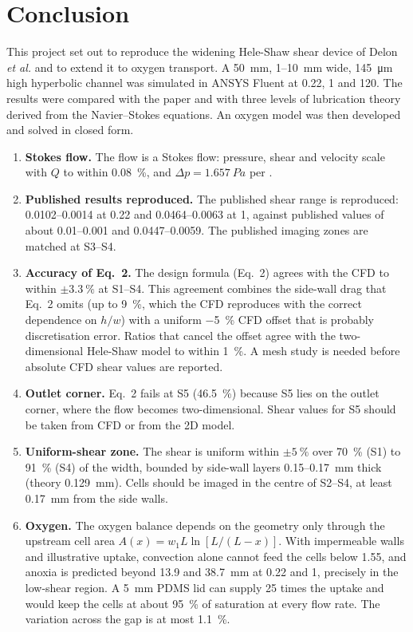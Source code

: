 \chapter{Conclusion}
\label{ch:conclusion}

This project set out to reproduce the widening Hele-Shaw shear device of Delon \emph{et al.} \citep{Delon2020} and to extend it to oxygen transport. A \SI{50}{mm}, \SI{1}{}--\SI{10}{mm} wide, \SI{145}{\micro\metre} high hyperbolic channel was simulated in ANSYS Fluent at 0.22, 1 and \SI{120}{\uLmin}. The results were compared with the paper and with three levels of lubrication theory derived from the Navier--Stokes equations. An oxygen model was then developed and solved in closed form.

\begin{enumerate}
\item \textbf{Stokes flow.} The flow is a Stokes flow: pressure, shear and velocity scale with $Q$ to within \SI{0.08}{\percent}, and $\Delta p=\SI{1.657}{Pa}$ per \ulmin.
\item \textbf{Published results reproduced.} The published shear range is reproduced: \SIrange{0.0102}{0.0014}{\dyncm} at \SI{0.22}{\uLmin} and \SIrange{0.0464}{0.0063}{\dyncm} at \SI{1}{\uLmin}, against published values of about 0.01--0.001 and 0.0447--0.0059. The published imaging zones are matched at S3--S4.
\item \textbf{Accuracy of Eq.~2.} The design formula (Eq.~2) agrees with the CFD to within $\pm\SI{3.3}{\percent}$ at S1--S4. This agreement combines the side-wall drag that Eq.~2 omits (up to \SI{+9}{\percent}, which the CFD reproduces with the correct dependence on $h/w$) with a uniform \SI{-5}{\percent} CFD offset that is probably discretisation error. Ratios that cancel the offset agree with the two-dimensional Hele-Shaw model to within \SI{1}{\percent}. A mesh study is needed before absolute CFD shear values are reported.
\item \textbf{Outlet corner.} Eq.~2 fails at S5 (\SI{+46.5}{\percent}) because S5 lies on the outlet corner, where the flow becomes two-dimensional. Shear values for S5 should be taken from CFD or from the 2D model.
\item \textbf{Uniform-shear zone.} The shear is uniform within $\pm\SI{5}{\percent}$ over \SI{70}{\percent} (S1) to \SI{91}{\percent} (S4) of the width, bounded by side-wall layers 0.15--\SI{0.17}{mm} thick (theory \SI{0.129}{mm}). Cells should be imaged in the centre of S2--S4, at least \SI{0.17}{mm} from the side walls.
\item \textbf{Oxygen.} The oxygen balance depends on the geometry only through the upstream cell area $A(x)=w_1L\ln[L/(L-x)]$. With impermeable walls and illustrative uptake, convection alone cannot feed the cells below \SI{1.55}{\uLmin}, and anoxia is predicted beyond 13.9 and \SI{38.7}{mm} at 0.22 and \SI{1}{\uLmin}, precisely in the low-shear region. A \SI{5}{mm} PDMS lid can supply 25 times the uptake and would keep the cells at about \SI{95}{\percent} of saturation at every flow rate. The variation across the gap is at most \SI{1.1}{\percent}.
\end{enumerate}

